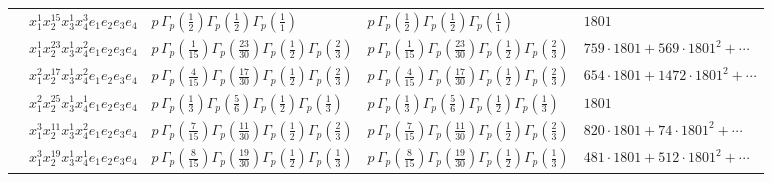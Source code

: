 \documentclass[11pt]{article}
\begin{document}
\begin{table}[ht]
{\begin{tabular}{@{}lllll@{}}
 & $x_{1}^{1} x_{2}^{15} x_{3}^{1} x_{4}^{3}  e_{1} e_{2} e_{3} e_{4}$ & $p \, \Gamma_p \left( \frac{1}{2} \right) \Gamma_p \left( \frac{1}{2} \right) \Gamma_p \left( \frac{1}{1} \right)$ & $p \, \Gamma_p \left( \frac{1}{2} \right) \Gamma_p \left( \frac{1}{2} \right) \Gamma_p \left( \frac{1}{1} \right)$ & $1801$ \\
 & $x_{1}^{1} x_{2}^{23} x_{3}^{1} x_{4}^{2}  e_{1} e_{2} e_{3} e_{4}$ & $p \, \Gamma_p \left( \frac{1}{15} \right) \Gamma_p \left( \frac{23}{30} \right) \Gamma_p \left( \frac{1}{2} \right) \Gamma_p \left( \frac{2}{3} \right)$ & $p \, \Gamma_p \left( \frac{1}{15} \right) \Gamma_p \left( \frac{23}{30} \right) \Gamma_p \left( \frac{1}{2} \right) \Gamma_p \left( \frac{2}{3} \right)$ & $759{\cdot}1801{+}569{\cdot}1801^{2}{+}\cdots$ \\
 & $x_{1}^{2} x_{2}^{17} x_{3}^{1} x_{4}^{2}  e_{1} e_{2} e_{3} e_{4}$ & $p \, \Gamma_p \left( \frac{4}{15} \right) \Gamma_p \left( \frac{17}{30} \right) \Gamma_p \left( \frac{1}{2} \right) \Gamma_p \left( \frac{2}{3} \right)$ & $p \, \Gamma_p \left( \frac{4}{15} \right) \Gamma_p \left( \frac{17}{30} \right) \Gamma_p \left( \frac{1}{2} \right) \Gamma_p \left( \frac{2}{3} \right)$ & $654{\cdot}1801{+}1472{\cdot}1801^{2}{+}\cdots$ \\
 & $x_{1}^{2} x_{2}^{25} x_{3}^{1} x_{4}^{1}  e_{1} e_{2} e_{3} e_{4}$ & $p \, \Gamma_p \left( \frac{1}{3} \right) \Gamma_p \left( \frac{5}{6} \right) \Gamma_p \left( \frac{1}{2} \right) \Gamma_p \left( \frac{1}{3} \right)$ & $p \, \Gamma_p \left( \frac{1}{3} \right) \Gamma_p \left( \frac{5}{6} \right) \Gamma_p \left( \frac{1}{2} \right) \Gamma_p \left( \frac{1}{3} \right)$ & $1801$ \\
 & $x_{1}^{3} x_{2}^{11} x_{3}^{1} x_{4}^{2}  e_{1} e_{2} e_{3} e_{4}$ & $p \, \Gamma_p \left( \frac{7}{15} \right) \Gamma_p \left( \frac{11}{30} \right) \Gamma_p \left( \frac{1}{2} \right) \Gamma_p \left( \frac{2}{3} \right)$ & $p \, \Gamma_p \left( \frac{7}{15} \right) \Gamma_p \left( \frac{11}{30} \right) \Gamma_p \left( \frac{1}{2} \right) \Gamma_p \left( \frac{2}{3} \right)$ & $820{\cdot}1801{+}74{\cdot}1801^{2}{+}\cdots$ \\
 & $x_{1}^{3} x_{2}^{19} x_{3}^{1} x_{4}^{1}  e_{1} e_{2} e_{3} e_{4}$ & $p \, \Gamma_p \left( \frac{8}{15} \right) \Gamma_p \left( \frac{19}{30} \right) \Gamma_p \left( \frac{1}{2} \right) \Gamma_p \left( \frac{1}{3} \right)$ & $p \, \Gamma_p \left( \frac{8}{15} \right) \Gamma_p \left( \frac{19}{30} \right) \Gamma_p \left( \frac{1}{2} \right) \Gamma_p \left( \frac{1}{3} \right)$ & $481{\cdot}1801{+}512{\cdot}1801^{2}{+}\cdots$ \\

\end{tabular}}
\end{table}
\end{document}
